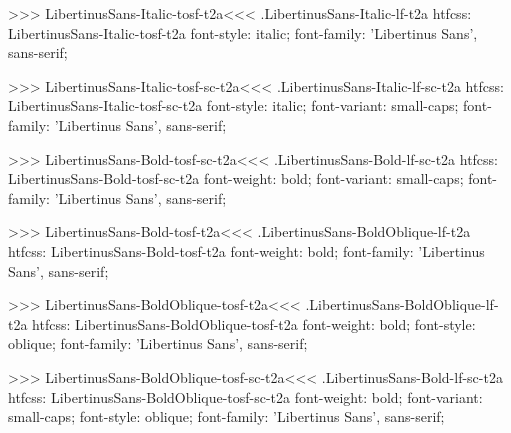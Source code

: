 {{{{>>>
\<LibertinusSans-Italic-tosf-t2a\><<<
.LibertinusSans-Italic-lf-t2a
htfcss:  LibertinusSans-Italic-tosf-t2a  font-style: italic; font-family: 'Libertinus Sans', sans-serif;

>>>
\<LibertinusSans-Italic-tosf-sc-t2a\><<<
.LibertinusSans-Italic-lf-sc-t2a
htfcss:  LibertinusSans-Italic-tosf-sc-t2a  font-style: italic; font-variant: small-caps; font-family: 'Libertinus Sans', sans-serif;

>>>
\<LibertinusSans-Bold-tosf-sc-t2a\><<<
.LibertinusSans-Bold-lf-sc-t2a
htfcss:  LibertinusSans-Bold-tosf-sc-t2a  font-weight: bold; font-variant: small-caps; font-family: 'Libertinus Sans', sans-serif;

>>>
\<LibertinusSans-Bold-tosf-t2a\><<<
.LibertinusSans-BoldOblique-lf-t2a
htfcss:  LibertinusSans-Bold-tosf-t2a  font-weight: bold; font-family: 'Libertinus Sans', sans-serif;

>>>
\<LibertinusSans-BoldOblique-tosf-t2a\><<<
.LibertinusSans-BoldOblique-lf-t2a
htfcss:  LibertinusSans-BoldOblique-tosf-t2a  font-weight: bold; font-style: oblique; font-family: 'Libertinus Sans', sans-serif;

>>>
\<LibertinusSans-BoldOblique-tosf-sc-t2a\><<<
.LibertinusSans-Bold-lf-sc-t2a
htfcss:  LibertinusSans-BoldOblique-tosf-sc-t2a  font-weight: bold; font-variant: small-caps; font-style: oblique; font-family: 'Libertinus Sans', sans-serif;

}}}}
